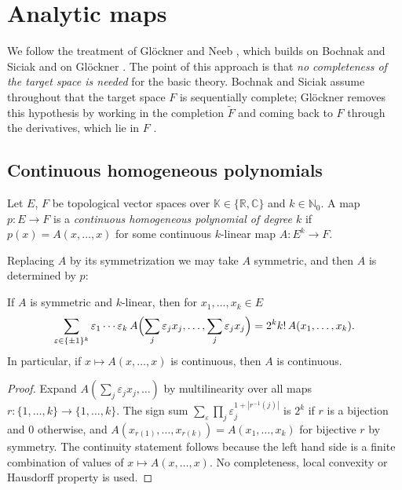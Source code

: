\chapter{Analytic maps}
\label{chap:analytic}

We follow the treatment of Glöckner and Neeb \cite[Ch.~2]{GN26}, which builds on Bochnak and Siciak
\cite{BS71a, BS71b} and on Glöckner \cite[§2]{Glo02}. The point of this approach is that \emph{no
completeness of the target space is needed} for the basic theory. Bochnak and Siciak assume
throughout that the target space $F$ is sequentially complete; Glöckner removes this hypothesis by
working in the completion $\widetilde F$ and coming back to $F$ through the derivatives, which lie
in $F$ \cite[Prop.~2.4, Lemma~2.5]{Glo02}.

\section{Continuous homogeneous polynomials}

\begin{definition}
  \label{def:hom-poly}
  \leanok
  Let $E$, $F$ be topological vector spaces over $\mathbb{K} \in \{\mathbb{R}, \mathbb{C}\}$ and
  $k \in \mathbb{N}_0$. A map $p \colon E \to F$ is a \emph{continuous homogeneous polynomial of
  degree $k$} if $p(x) = A(x, \dots, x)$ for some continuous $k$-linear map
  $A \colon E^k \to F$.
\end{definition}

Replacing $A$ by its symmetrization we may take $A$ symmetric, and then $A$ is determined by $p$:

\begin{theorem}
  \label{thm:polarization}
  \leanok
  If $A$ is symmetric and $k$-linear, then for $x_1, \dots, x_k \in E$
  \[
    \sum_{\varepsilon \in \{\pm 1\}^k} \varepsilon_1 \cdots \varepsilon_k \,
    A\Bigl(\sum_j \varepsilon_j x_j, \dots, \sum_j \varepsilon_j x_j\Bigr)
    = 2^k k! \, A(x_1, \dots, x_k).
  \]
  In particular, if $x \mapsto A(x, \dots, x)$ is continuous, then $A$ is continuous.
\end{theorem}

\begin{proof}
  \leanok
  Expand $A(\sum_j \varepsilon_j x_j, \dots)$ by multilinearity over all maps
  $r \colon \{1, \dots, k\} \to \{1, \dots, k\}$. The sign sum
  $\sum_\varepsilon \prod_j \varepsilon_j^{1 + |r^{-1}(j)|}$ is $2^k$ if $r$ is a bijection and
  $0$ otherwise, and $A(x_{r(1)}, \dots, x_{r(k)}) = A(x_1, \dots, x_k)$ for bijective $r$ by
  symmetry. The continuity statement follows because the left hand side is a finite combination of
  values of $x \mapsto A(x, \dots, x)$. No completeness, local convexity or Hausdorff property is
  used.
\end{proof}

